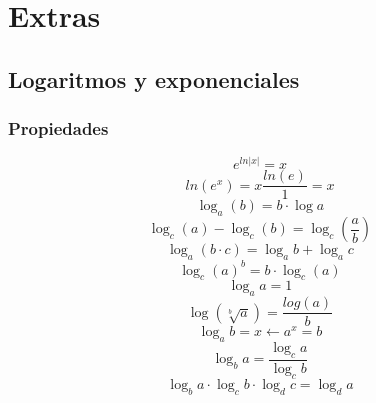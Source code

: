 \documentclass[
	12pt, %
	fleqn, %
	a4paper, %
]{LegrandOrangeBook}
\begin{document}
\part{Extras}
\chapter{Logaritmos y exponenciales}
\section{Propiedades}
\begin{equation}\label{art:expaln}
e^{ln|x|}=x
\end{equation}
\begin{equation}\label{art:lnaexp}
ln(e^x)=x\frac{ln(e)}{1}=x
\end{equation}
\begin{equation}\label{art:logaritmos}
\log_a(b)=b\cdot\log a
\end{equation}
\begin{equation}\label{art:logdiv}
\log_c(a)-\log_c(b)=\log_c\left(\frac{a}{b}\right)
\end{equation}
\begin{equation}
\label{art:logmulti}
\log_a(b\cdot c)=\log_ab+\log_ac
\end{equation}
\begin{equation}\label{art:logexp}
\log_c(a)^b=b\cdot\log_c(a)
\end{equation}
\begin{equation}
\label{art:log1}
\log_aa=1
\end{equation}
\begin{equation}\label{art:raizlog}
\log\left(\sqrt[b]{a}\right)=\frac{log(a)}{b}
\end{equation}
\begin{equation}\label{art:log y expo}
\log_ab=x\leftarrow a^x=b
\end{equation}
\begin{equation}
\label{art:logcambio de bse}
\log_ba=\frac{\log_ca}{\log_cb}
\end{equation}
\begin{equation}
\label{art:log cadena}
\log_ba\cdot\log_cb\cdot\log_dc=\log_da
\end{equation}
\end{document}
